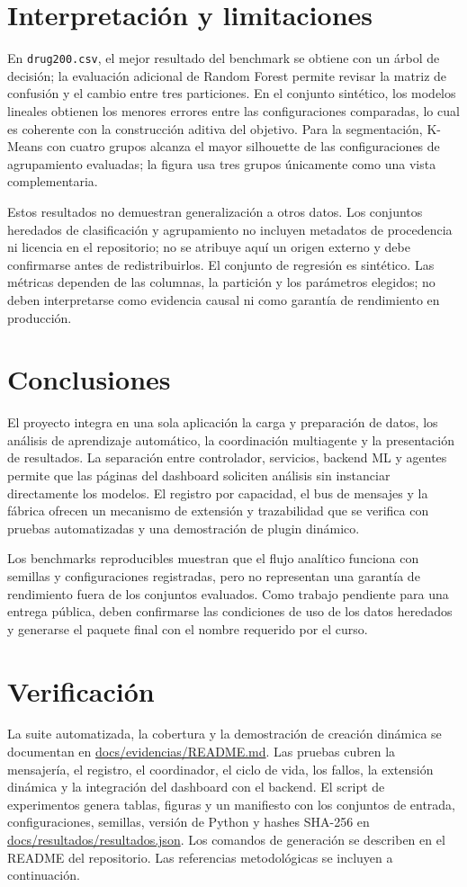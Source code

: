 \documentclass[11pt,a4paper]{article}
\begin{document}
\section{Interpretación y limitaciones}
En \texttt{drug200.csv}, el mejor resultado del benchmark se obtiene con un árbol de decisión; la evaluación
adicional de Random Forest permite revisar la matriz de confusión y el cambio entre tres particiones. En el conjunto
sintético, los modelos lineales obtienen los menores errores entre las configuraciones comparadas, lo cual es
coherente con la construcción aditiva del objetivo. Para la segmentación, K-Means con cuatro grupos alcanza el
mayor silhouette de las configuraciones de agrupamiento evaluadas; la figura usa tres grupos únicamente como una
vista complementaria.

Estos resultados no demuestran generalización a otros datos. Los conjuntos heredados de clasificación y
agrupamiento no incluyen metadatos de procedencia ni licencia en el repositorio; no se atribuye aquí un origen
externo y debe confirmarse antes de redistribuirlos. El conjunto de regresión es sintético. Las métricas dependen
de las columnas, la partición y los parámetros elegidos; no deben interpretarse como evidencia causal ni como
garantía de rendimiento en producción.

\section{Conclusiones}
El proyecto integra en una sola aplicación la carga y preparación de datos, los análisis de aprendizaje automático,
la coordinación multiagente y la presentación de resultados. La separación entre controlador, servicios, backend
ML y agentes permite que las páginas del dashboard soliciten análisis sin instanciar directamente los modelos.
El registro por capacidad, el bus de mensajes y la fábrica ofrecen un mecanismo de extensión y trazabilidad que
se verifica con pruebas automatizadas y una demostración de plugin dinámico.

Los benchmarks reproducibles muestran que el flujo analítico funciona con semillas y configuraciones registradas,
pero no representan una garantía de rendimiento fuera de los conjuntos evaluados. Como trabajo pendiente para una
entrega pública, deben confirmarse las condiciones de uso de los datos heredados y generarse el paquete final con
el nombre requerido por el curso.

\section{Verificación}
La suite automatizada, la cobertura y la demostración de creación dinámica se documentan en
\url{docs/evidencias/README.md}. Las pruebas cubren la mensajería, el registro, el coordinador, el ciclo de vida,
los fallos, la extensión dinámica y la integración del dashboard con el backend. El script de experimentos genera
tablas, figuras y un manifiesto con los conjuntos de entrada, configuraciones, semillas, versión de Python y hashes
SHA-256 en \url{docs/resultados/resultados.json}. Los comandos de generación se describen en el README del
repositorio. Las referencias metodológicas se incluyen a continuación.



\end{document}
